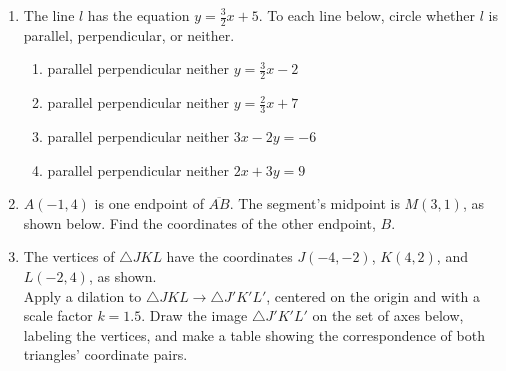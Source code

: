 \documentclass[12pt, twoside]{article}
\begin{document}
\begin{enumerate}
  \item The line $l$ has the equation $y=\frac{3}{2}x+5$. To each line below, circle whether $l$ is parallel, perpendicular, or neither.
    \begin{enumerate}
      \item parallel \quad perpendicular \quad neither \qquad $y=\frac{3}{2}x-2$
      \vspace{0.5cm}
      \item parallel \quad perpendicular \quad neither \qquad $y=\frac{2}{3}x+7$
      \vspace{0.5cm}
      \item parallel \quad perpendicular \quad neither \qquad $3x-2y=-6$
      \vspace{2cm}
      \item parallel \quad perpendicular \quad neither \qquad $2x+3y=9$
      \vspace{2cm}
    \end{enumerate}

  \item $A(-1,4)$ is one endpoint of $\overline{AB}$. The segment's midpoint is $M(3,1)$, as shown below. Find the coordinates of the other endpoint, $B$.
      \begin{flushright}
      \end{flushright}

\newpage
  \item The vertices of $\triangle JKL$ have the coordinates $J(-4,-2)$, $K(4,2)$, and $L(-2,4)$, as shown. \\[0.25cm]
    Apply a dilation to $\triangle JKL \rightarrow \triangle J'K'L'$, centered on the origin and with a scale factor $k=1.5$. Draw the image $\triangle J'K'L'$ on the set of axes below, labeling the vertices, and make a table showing the correspondence of both triangles' coordinate pairs.
      \begin{flushright}
      \end{flushright}


\end{enumerate}
\end{document}
